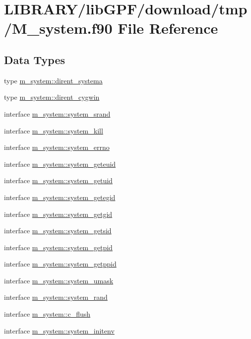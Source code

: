 \hypertarget{M__system_8f90}{}\section{L\+I\+B\+R\+A\+R\+Y/lib\+G\+P\+F/download/tmp/\+M\+\_\+system.f90 File Reference}
\label{M__system_8f90}
\subsection*{Data Types}
\begin{DoxyCompactItemize}
\item 
type \hyperlink{structm__system_1_1dirent__systema}{m\+\_\+system\+::dirent\+\_\+systema}
\item 
type \hyperlink{structm__system_1_1dirent__cygwin}{m\+\_\+system\+::dirent\+\_\+cygwin}
\item 
interface \hyperlink{interfacem__system_1_1system__srand}{m\+\_\+system\+::system\+\_\+srand}
\item 
interface \hyperlink{interfacem__system_1_1system__kill}{m\+\_\+system\+::system\+\_\+kill}
\item 
interface \hyperlink{interfacem__system_1_1system__errno}{m\+\_\+system\+::system\+\_\+errno}
\item 
interface \hyperlink{interfacem__system_1_1system__geteuid}{m\+\_\+system\+::system\+\_\+geteuid}
\item 
interface \hyperlink{interfacem__system_1_1system__getuid}{m\+\_\+system\+::system\+\_\+getuid}
\item 
interface \hyperlink{interfacem__system_1_1system__getegid}{m\+\_\+system\+::system\+\_\+getegid}
\item 
interface \hyperlink{interfacem__system_1_1system__getgid}{m\+\_\+system\+::system\+\_\+getgid}
\item 
interface \hyperlink{interfacem__system_1_1system__getsid}{m\+\_\+system\+::system\+\_\+getsid}
\item 
interface \hyperlink{interfacem__system_1_1system__getpid}{m\+\_\+system\+::system\+\_\+getpid}
\item 
interface \hyperlink{interfacem__system_1_1system__getppid}{m\+\_\+system\+::system\+\_\+getppid}
\item 
interface \hyperlink{interfacem__system_1_1system__umask}{m\+\_\+system\+::system\+\_\+umask}
\item 
interface \hyperlink{interfacem__system_1_1system__rand}{m\+\_\+system\+::system\+\_\+rand}
\item 
interface \hyperlink{interfacem__system_1_1c__flush}{m\+\_\+system\+::c\+\_\+flush}
\item 
interface \hyperlink{interfacem__system_1_1system__initenv}{m\+\_\+system\+::system\+\_\+initenv}
\end{DoxyCompactItemize}
